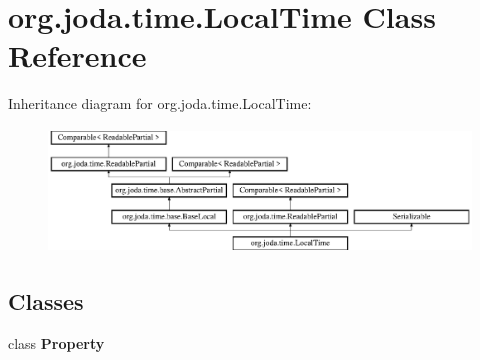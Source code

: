 \hypertarget{classorg_1_1joda_1_1time_1_1_local_time}{\section{org.\-joda.\-time.\-Local\-Time Class Reference}
\label{classorg_1_1joda_1_1time_1_1_local_time}
}
Inheritance diagram for org.\-joda.\-time.\-Local\-Time\-:\begin{figure}[H]
\begin{center}
\leavevmode
\includegraphics[height=3.317535cm]{classorg_1_1joda_1_1time_1_1_local_time}
\end{center}
\end{figure}
\subsection*{Classes}
\begin{DoxyCompactItemize}
\item 
class {\bfseries Property}
\end{DoxyCompactItemize}
